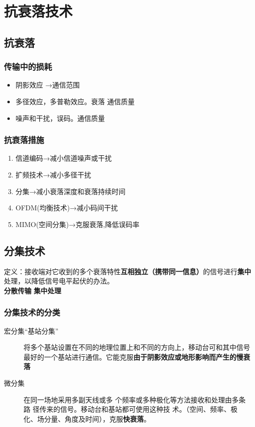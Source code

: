 \chapter{抗衰落技术}
\section{抗衰落}
\subsection{传输中的损耗}
\begin{itemize}
	\item 阴影效应 →通信范围
	\item 多径效应，多普勒效应。衰落 通信质量
	\item 噪声和干扰，误码。通信质量
\end{itemize}
\subsection{抗衰落措施
}
\begin{enumerate}
	\item 信道编码→减小信道噪声或干扰
	\item 扩频技术→减小多径干扰
	\item 分集→减小衰落深度和衰落持续时间
	\item OFDM(均衡技术)→减小码间干扰
	\item  MIMO(空间分集)→克服衰落,降低误码率
\end{enumerate}

\section{分集技术}
定义：接收端对它收到的多个衰落特性\textbf{互相独立（携带同一信息）}的信号进行\textbf{集中}处理，以降低信号电平起伏的办法。\\
{\centering \textbf{分散传输} \hspace{3cm} \textbf{集中处理}}
\subsection{分集技术的分类}
\begin{description}
	\item[宏分集“基站分集”] 将多个基站设置在不同的地理位置上和不同的方向上，移动台可和其中信号最好的一个基站进行通信。它能克服\textbf{由于阴影效应或地形影响而产生的慢衰落}\item[微分集] 在同一场地采用多副天线或多
	个频率或多种极化等方法接收和处理由多条路
	径传来的信号。移动台和基站都可使用这种技
	术。（空间、频率、极化、场分量、角度及时间），克服\textbf{快衰落}。
\end{description}
